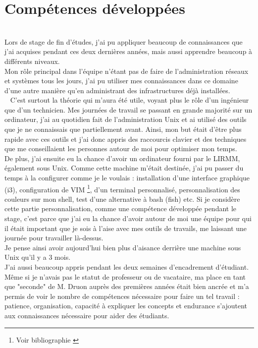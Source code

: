 \documentclass[11pt,french,a4paper]{report}
\begin{document}
    \section{Compétences développées} \\
Lors de stage de fin d'études, j'ai pu appliquer beaucoup de connaissances que j'ai acquises pendant ces deux dernières années,
mais aussi apprendre beaucoup à différents niveaux.\\
Mon rôle principal dans l'équipe n'étant pas de faire de l'administration réseaux et systèmes tous les jours, 
j'ai pu utiliser mes connaissances dans ce domaine d'une autre manière qu'en administrant des infrastructures déjà installées. \\ 
C'est surtout la théorie qui m'aura été utile, voyant plus le rôle d'un ingénieur que d'un technicien. 
Mes journées de travail se passant en grande majorité sur un ordinateur, j'ai au quotidien fait de l'administration Unix et ai
utilisé des outils que je ne connaissais que partiellement avant. Ainsi, mon but était d'être plus rapide avec ces outils 
et j'ai donc appris des raccourcis clavier et des techniques que me conseillaient les personnes autour de moi pour optimiser 
mon temps. \\
De plus, j'ai ensuite eu la chance d'avoir un ordinateur fourni par le LIRMM, également sous Unix.
Comme cette machine m'était destinée, j'ai pu passer du temps à la configurer comme je le voulais : 
installation d'une interface graphique (i3), configuration de VIM \footnote{Voir bibliographie \cite{ref6}}, d'un terminal personnalisé, personnalisation des couleurs 
sur mon shell, test d'une alternative à bash (fish) etc. 
Si je considère cette partie personnalisation, comme une compétence développée pendant le stage, c'est parce que j'ai eu la chance 
d'avoir autour de moi une équipe pour qui il était important que je sois à l'aise avec mes outils de travails, me laissant une 
journée pour travailler là-dessus. \\
Je pense ainsi avoir aujourd'hui bien plus d'aisance derrière une machine sous Unix qu'il y a 3 mois. \\
J'ai aussi beaucoup appris pendant les deux semaines d'encadrement d'étudiant. Même si je n'avais pas le statut de professeur 
ou de vacataire, ma place en tant que "seconde" de M. Druon auprès des premières années était bien ancrée 
et m'a permis de voir le nombre de compétences nécessaire pour faire un tel travail : patience, organisation, 
capacité à expliquer les concepts et endurance s'ajoutent aux connaissances nécessaire pour aider des étudiants. 
\end{document}

